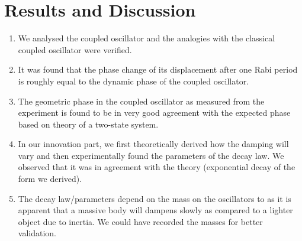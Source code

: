 \chapter{\label{results}Results and Discussion}
\begin{enumerate}
	\item We analysed the coupled oscillator and the analogies with the classical coupled oscillator were verified.
	\item It was found that the phase change of its displacement after
	one Rabi period is roughly equal to the dynamic phase of the coupled oscillator.
	\item The geometric phase in the coupled oscillator as measured from the
	experiment is found to be in very good agreement with the expected phase based on theory of a two-state system.
	\item In our innovation part, we first theoretically derived how the damping will vary and then experimentally found the parameters of the decay law. We observed that it was in agreement with the theory (exponential decay of the form we derived).
	\item The decay law/parameters depend on the mass on the oscillators to as it is apparent that a massive body will dampens slowly as compared to a lighter object due to inertia. We could have recorded the masses for better validation.
\end{enumerate}
\setcounter{equation}{0}
\setcounter{table}{0}
\setcounter{figure}{0}


    



